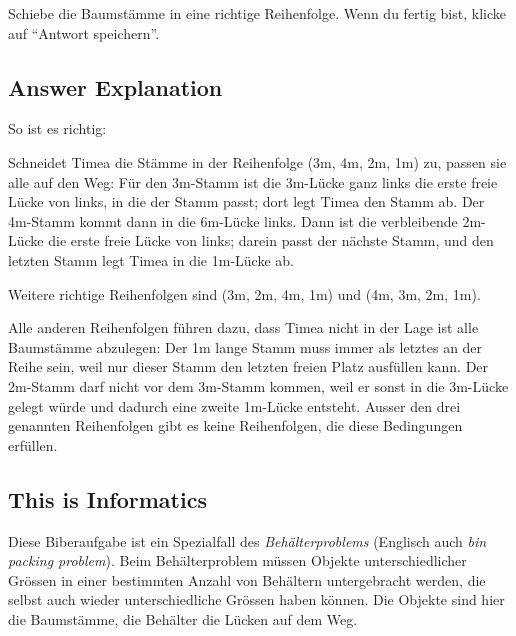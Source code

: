 \documentclass[a4paper,11pt]{report}
\newcommand{\taskGraphicsFolder}{..}
\begin{document}
Schiebe die Baumstämme in eine richtige Reihenfolge. Wenn du fertig bist, klicke auf \enquote{Antwort speichern}.


\subsection*{Answer Explanation}

So ist es richtig:

{\centering%
\par}

Schneidet Timea die Stämme in der Reihenfolge (3\thinspace{}m, 4\thinspace{}m, 2\thinspace{}m, 1\thinspace{}m) zu, passen sie alle auf den Weg: Für den 3\thinspace{}m-Stamm ist die 3\thinspace{}m-Lücke ganz links die erste  freie Lücke von links, in die der Stamm passt; dort legt Timea den Stamm ab. Der 4\thinspace{}m-Stamm kommt dann in die 6\thinspace{}m-Lücke links. Dann ist die verbleibende 2\thinspace{}m-Lücke die erste freie Lücke von links; darein passt der nächste Stamm, und den letzten Stamm legt Timea in die 1\thinspace{}m-Lücke ab.

Weitere richtige Reihenfolgen sind (3\thinspace{}m, 2\thinspace{}m, 4\thinspace{}m, 1\thinspace{}m) und (4\thinspace{}m, 3\thinspace{}m, 2\thinspace{}m, 1\thinspace{}m).

Alle anderen Reihenfolgen führen dazu, dass Timea nicht in der Lage ist alle Baumstämme abzulegen: Der 1\thinspace{}m lange Stamm muss immer als letztes an der Reihe sein, weil nur dieser Stamm den letzten freien Platz ausfüllen kann. Der 2\thinspace{}m-Stamm darf nicht vor dem 3\thinspace{}m-Stamm kommen, weil er sonst in die 3\thinspace{}m-Lücke gelegt würde und dadurch eine zweite 1\thinspace{}m-Lücke entsteht. Ausser den drei genannten Reihenfolgen gibt es keine Reihenfolgen, die diese Bedingungen erfüllen.


\subsection*{This is Informatics}

Diese Biberaufgabe ist ein Spezialfall des \emph{Behälterproblems} (Englisch auch \emph{bin packing problem}). Beim Behälterproblem müssen Objekte unterschiedlicher Grössen in einer bestimmten Anzahl von Behältern untergebracht werden, die selbst auch wieder unterschiedliche Grössen haben können. Die Objekte sind hier die Baumstämme, die Behälter die Lücken auf dem Weg.
\end{document}

